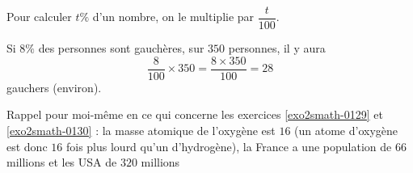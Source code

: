 \begin{Aretenir}
    Pour calculer \( t\%\) d'un nombre, on le multiplie par \( \dfrac{ t }{ 100 }\).
\end{Aretenir}

\begin{example}
    Si \( 8\%\) des personnes sont gauchères, sur \( 350\) personnes, il y aura
    \begin{equation}
        \frac{ 8 }{ 100 }\times 350=\frac{ 8\times 350 }{ 100 }=28
    \end{equation}
    gauchers (environ).
\end{example}


{\small Rappel pour moi-même en ce qui concerne les exercices \ref{exo2smath-0129} et \ref{exo2smath-0130} : la masse atomique de l'oxygène est \( 16\) (un atome d'oxygène est donc \( 16\) fois plus lourd qu'un d'hydrogène), la France a une population de \( 66\) millions et les USA de \( 320\) millions}


